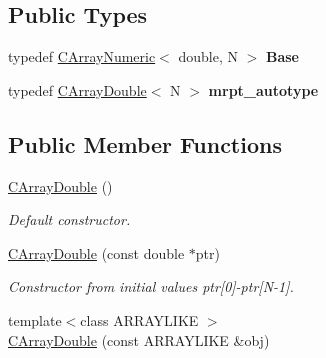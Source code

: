 \subsection*{Public Types}
\begin{DoxyCompactItemize}
\item 
typedef \hyperlink{classydlidar_1_1math_1_1_c_array_numeric}{C\+Array\+Numeric}$<$ double, N $>$ {\bfseries Base}\hypertarget{classydlidar_1_1math_1_1_c_array_double_ad71b10a541edab1fea3f3447e9e3e811}{}\label{classydlidar_1_1math_1_1_c_array_double_ad71b10a541edab1fea3f3447e9e3e811}

\item 
typedef \hyperlink{classydlidar_1_1math_1_1_c_array_double}{C\+Array\+Double}$<$ N $>$ {\bfseries mrpt\+\_\+autotype}\hypertarget{classydlidar_1_1math_1_1_c_array_double_a66675e5b71cc8d55c0518e52a0f192a9}{}\label{classydlidar_1_1math_1_1_c_array_double_a66675e5b71cc8d55c0518e52a0f192a9}

\end{DoxyCompactItemize}
\subsection*{Public Member Functions}
\begin{DoxyCompactItemize}
\item 
\hyperlink{classydlidar_1_1math_1_1_c_array_double_aaf4b7f751fa0f2591573462357e51a8b}{C\+Array\+Double} ()\hypertarget{classydlidar_1_1math_1_1_c_array_double_aaf4b7f751fa0f2591573462357e51a8b}{}\label{classydlidar_1_1math_1_1_c_array_double_aaf4b7f751fa0f2591573462357e51a8b}

\begin{DoxyCompactList}\small\item\em Default constructor. \end{DoxyCompactList}\item 
\hyperlink{classydlidar_1_1math_1_1_c_array_double_a8aaf4520b17cad0b7c0cc72614c6d7ce}{C\+Array\+Double} (const double $\ast$ptr)\hypertarget{classydlidar_1_1math_1_1_c_array_double_a8aaf4520b17cad0b7c0cc72614c6d7ce}{}\label{classydlidar_1_1math_1_1_c_array_double_a8aaf4520b17cad0b7c0cc72614c6d7ce}

\begin{DoxyCompactList}\small\item\em Constructor from initial values ptr\mbox{[}0\mbox{]}-\/ptr\mbox{[}N-\/1\mbox{]}. \end{DoxyCompactList}\item 
{\footnotesize template$<$class A\+R\+R\+A\+Y\+L\+I\+KE $>$ }\\\hyperlink{classydlidar_1_1math_1_1_c_array_double_a05eae97a2c7d7d64b3df0011b8e272f9}{C\+Array\+Double} (const A\+R\+R\+A\+Y\+L\+I\+KE \&obj)
\end{DoxyCompactItemize}


